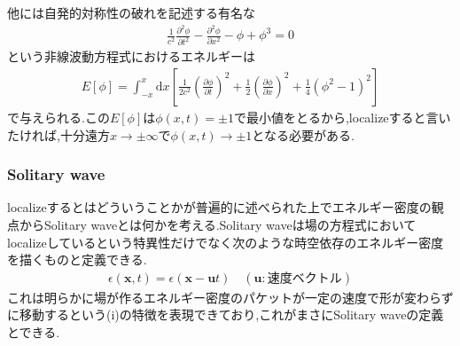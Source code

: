 \documentclass[dvipdfmx,11pt,a4paper,oneside,openany]{jsbook}
\begin{document}
他には自発的対称性の破れを記述する有名な
\begin{align}
    \frac{1}{c^{2}} \frac{\partial^{2} \phi}{\partial t^{2}}-\frac{\partial^{2} \phi}{\partial x^{2}}-\phi+\phi^{3}=0
\end{align}
という非線波動方程式におけるエネルギーは
\begin{align}
    E[\phi]=\int_{-x}^{x} \mathrm{d} x\left[\frac{1}{2 c^{2}}\left(\frac{\partial \phi}{\partial t}\right)^{2}+\frac{1}{2}\left(\frac{\partial \phi}{\partial x}\right)^{2}+\frac{1}{4}\left(\phi^{2}-1\right)^{2}\right]
\end{align}
で与えられる.この$E[\phi]$は$\phi(x,t)=\pm 1$で最小値をとるから,localizeすると言いたければ,十分遠方$x\rightarrow \pm\infty$で$\phi(x,t)\rightarrow \pm 1$となる必要がある.

\subsubsection{Solitary wave}
localizeするとはどういうことかが普遍的に述べられた上でエネルギー密度の観点からSolitary waveとは何かを考える.Solitary waveは場の方程式においてlocalizeしているという特異性だけでなく次のような時空依存のエネルギー密度を描くものと定義できる.
\begin{align}
    \epsilon(\bm{x},t)=\epsilon(\bm{x}-\bm{u}t)\quad (\bm{u}: \text{速度ベクトル})\label{eq:2.8}
\end{align}
これは明らかに場が作るエネルギー密度のパケットが一定の速度で形が変わらずに移動するという(i)の特徴を表現できており,これがまさにSolitary  waveの定義とできる.
\end{document}
